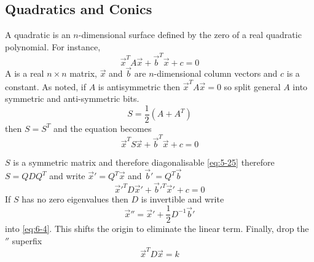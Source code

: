 \documentclass{article}
\numberwithin{equation}{section}
\begin{document}
\subsection{Quadratics and Conics}
A quadratic is an $n$-dimensional surface defined by the zero of a real quadratic polynomial. For instance,
\[
    \vec x^T A \vec x + \vec b^T \vec x + c = 0
\]
A is a real $n \times n$ matrix, $\vec x$ and $\vec b$ are $n$-dimensional column vectors and $c$ is a constant.
As noted, if $A$ is antisymmetric then $\vec x^T A \vec x = 0$ so split general $A$ into symmetric and anti-symmetric bits.
\[
    S = \frac{1}{2}(A + A^T)  
\]
then $S = S^T$ and the equation becomes
\begin{equation}\label{eq:6-3}
    \vec x^T S \vec x + \vec b^T \vec x + c = 0
\end{equation}

$S$ is a symmetric matrix and therefore diagonalisable \eqref{eq:5-25} therefore $S = Q D Q^T$ and write $\vec x' = Q^T \vec x$ and $\vec b' = Q^T \vec b$
\begin{equation}\label{eq:6-4}
    \vec{x}'^T D \vec x' + \vec{b}'^T \vec x' + c = 0
\end{equation}
If $S$ has no zero eigenvalues then $D$ is invertible and write
\[
    \vec{x}{''} = \vec x' + \frac{1}{2} D^{-1} \vec b' 
\]
into \eqref{eq:6-4}. This shifts the origin to eliminate the linear term. Finally, drop the ${''}$ superfix
\begin{equation}\label{eq:6-5}
    \vec x^T D \vec x = k
\end{equation}
\end{document}
